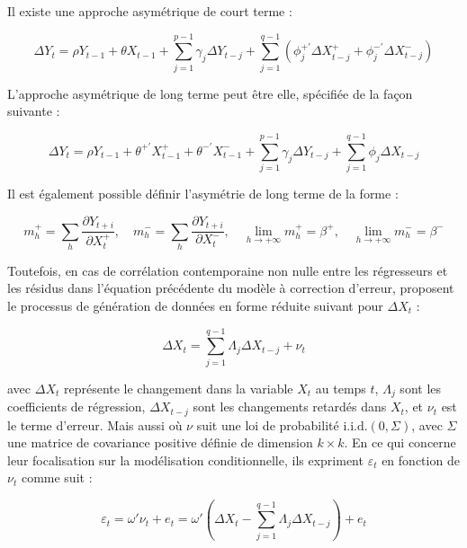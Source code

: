 Il existe une approche asymétrique de court terme :

\begin{equation}
    \Delta Y_t = \rho Y_{t-1} + \theta X_{t-1} + \sum_{j=1}^{p-1} \gamma_j \Delta Y_{t-j} + \sum_{j=1}^{q-1} \left ( \phi_j^{+'} \Delta X^+_{t-j} + \phi_j^{-'} \Delta X^-_{t-j} \right )   
\end{equation}

L'approche asymétrique de long terme peut être elle, spécifiée de la façon suivante : 

\begin{equation}
    \Delta Y_t = \rho Y_{t-1} + \theta^{+'} X^+_{t-1} + \theta^{-'} X_{t-1}^- + \sum_{j=1}^{p-1} \gamma_j \Delta Y_{t-j} + \sum_{j=1}^{q-1} \phi_j \Delta X_{t-j}
\end{equation}

Il est également possible définir l'asymétrie de long terme de la forme : 

\[
m_h^+ = \sum_{h} \frac{\partial Y_{t+i}}{\partial X_t^+}, \quad m_h^- = \sum_{h} \frac{\partial Y_{t+i}}{\partial X_t^-}, \quad \lim_{h\to +\infty} m_h^+ = \beta^+, \quad \lim_{h\to +\infty} m_h^- = \beta^- \]

Toutefois, en cas de corrélation contemporaine non nulle entre les régresseurs et les résidus dans l'équation précédente du modèle à correction d'erreur, \cite{Shin} proposent le processus de génération de données en forme réduite suivant pour $\Delta X_t$ :

\begin{equation}
  \Delta X_t = \sum_{j=1}^{q-1} \Lambda_j \Delta X_{t-j} + \nu_t  
\end{equation}

avec \( \Delta X_t \) représente le changement dans la variable \( X_t \) au temps \( t \), \( \Lambda_j \) sont les coefficients de régression, \( \Delta X_{t-j} \) sont les changements retardés dans \( X_t \), et \( \nu_t \) est le terme d'erreur. Mais aussi où \( \nu \) suit une loi de probabilité \( \text{i.i.d.}(0, \Sigma) \), avec \( \Sigma \) une matrice de covariance positive définie de dimension \( k \times k \). En ce qui concerne leur focalisation sur la modélisation conditionnelle, ils expriment \( \varepsilon_t \) en fonction de \( \nu_t \) comme suit : 

\begin{equation}
\varepsilon_t = \omega' \nu_t + e_t = \omega' \left( \Delta X_t - \sum_{j=1}^{q-1} \Lambda_j \Delta X_{t-j} \right) + e_t
\end{equation}

